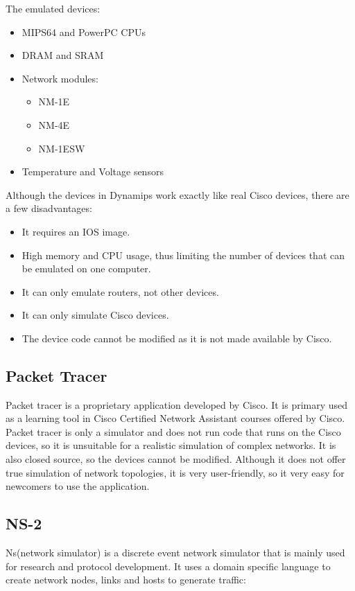 The emulated devices:
\begin{itemize}
  \item MIPS64 and PowerPC CPUs
  \item DRAM and SRAM
  \item Network modules:
    \begin{itemize}
      \item NM-1E
      \item NM-4E
      \item NM-1ESW
    \end{itemize}
  \item Temperature and Voltage sensors
\end{itemize}

Although the devices in Dynamips work exactly like real Cisco devices, there are a few disadvantages:
\begin{itemize}
  \item It requires an IOS image.
  \item High memory and CPU usage, thus limiting the number of devices that can be emulated on one computer.
  \item It can only emulate routers, not other devices.
  \item It can only simulate Cisco devices.
  \item The device code cannot be modified as it is not made available by Cisco.
\end{itemize}

\subsection{Packet Tracer}

Packet tracer is a proprietary application developed by Cisco. It is primary used as a learning tool
in Cisco Certified Network Assistant courses offered by Cisco.
Packet tracer is only a simulator and does not run code that runs on the Cisco devices, so
it is unsuitable for a realistic simulation of complex networks. It is also closed source, so
the devices cannot be modified. Although it does not offer true simulation of network topologies,
it is very user-friendly, so it very easy for newcomers to use the application.

\subsection{NS-2}
Ns(network simulator) is a discrete event network simulator that is mainly used for research and 
protocol development. It uses a domain specific language to create network nodes, links and
hosts to generate traffic:

